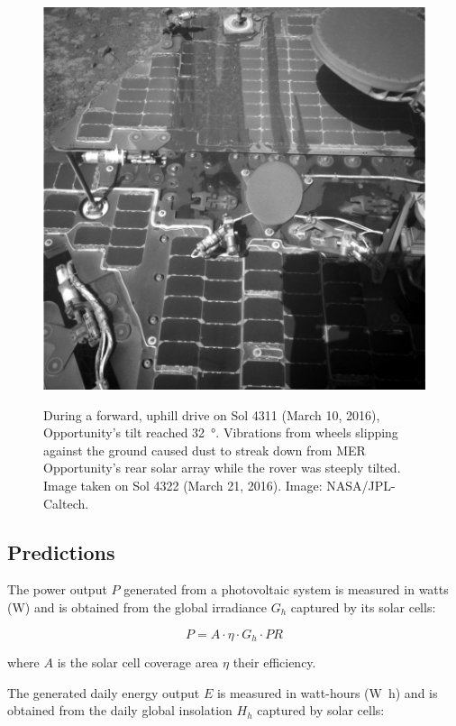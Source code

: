 \begin{figure}[h]
  \centering
  \hypersetup{linkcolor=captionTextColor}
  \includegraphics[width=0.5\linewidth]{sections/mars-solar-energy/photovoltaic-energy/images/mer-opportunity-dust-streaks.png}\\
  \caption[Streak of dust on \ac{MER} Opportunity's rear solar array during a steep tilt]
          {During a forward, uphill drive on Sol 4311 (March 10, 2016), Opportunity's tilt reached \SI{32}{\degree}. Vibrations from wheels slipping against the ground caused dust to streak down from \ac{MER} Opportunity's rear solar array while the rover was steeply tilted. Image taken on Sol 4322 (March 21, 2016). Image: \ac{NASA}/\ac{JPL}-Caltech.}
  \label{fig:image:mer-opportunity-dust-streaks}
\end{figure}

\subsection{Predictions}
\label{sec:PowerAndEnergyPredictions:Predictions}

The power output $P$ generated from a photovoltaic system is measured in watts (\si{\watt}) and is obtained from the global irradiance $G_{h}$ captured by its solar cells:

\begin{equation}
  \label{eq:SA_power}
  P = A \cdot \eta \cdot G_{h} \cdot PR
\end{equation}

where $A$ is the solar cell coverage area $\eta$ their efficiency.

The generated daily energy output $E$ is measured in watt-hours (\si{\watt\hour}) and is obtained from the daily global insolation $H_{h}$ captured by solar cells:

